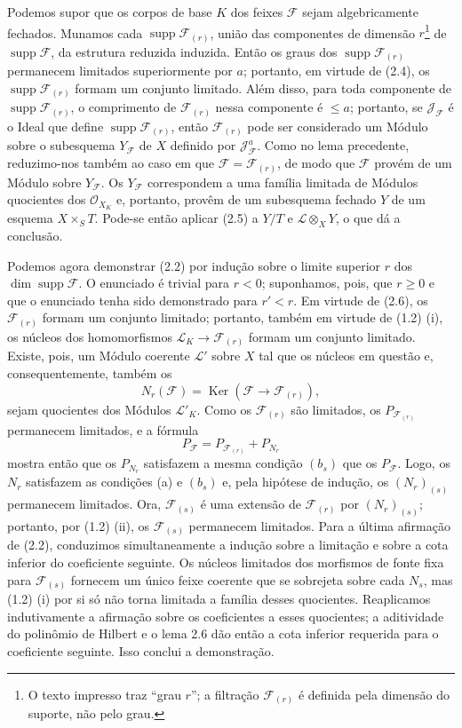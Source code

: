 Podemos supor que os corpos de base $K$ dos feixes $\mathcal F$ sejam
algebricamente fechados. Munamos cada
$\operatorname{supp}\mathcal F_{(r)}$, união das componentes de dimensão
$r$\footnote{O texto impresso traz “grau $r$”; a filtração
$\mathcal F_{(r)}$ é definida pela dimensão do suporte, não pelo grau.} de
$\operatorname{supp}\mathcal F$, da estrutura reduzida induzida. Então os graus dos
$\operatorname{supp}\mathcal F_{(r)}$ permanecem limitados superiormente por
$a$; portanto, em virtude de (2.4), os
$\operatorname{supp}\mathcal F_{(r)}$ formam um conjunto limitado. Além disso,
para toda componente de $\operatorname{supp}\mathcal F_{(r)}$, o comprimento de
$\mathcal F_{(r)}$ nessa componente é $\leq a$; portanto, se
$\mathcal J_{\mathcal F}$ é o Ideal que define
$\operatorname{supp}\mathcal F_{(r)}$, então $\mathcal F_{(r)}$
pode ser considerado um Módulo sobre o subesquema $Y_{\mathcal F}$ de $X$
definido por $\mathcal J_{\mathcal F}^{a}$. Como no lema precedente, reduzimo-nos também
ao caso em que $\mathcal F=\mathcal F_{(r)}$, de modo que $\mathcal F$
provém de um Módulo sobre $Y_{\mathcal F}$. Os $Y_{\mathcal F}$ correspondem
a uma família limitada de Módulos quocientes dos $\mathcal O_{X_K}$ e,
portanto, provêm de um subesquema fechado $Y$ de um esquema $X\times_S T$.
Pode-se então aplicar (2.5) a $Y/T$ e $\mathcal L\otimes_XY$, o que dá a
conclusão.

Podemos agora demonstrar (2.2) por indução sobre o limite superior $r$ dos
$\dim\operatorname{supp}\mathcal F$. O enunciado é trivial para $r<0$;
suponhamos, pois, que $r\geq0$ e que o enunciado tenha sido demonstrado para
$r'<r$. Em virtude de (2.6), os $\mathcal F_{(r)}$ formam um conjunto
limitado; portanto, também em virtude de (1.2) (i), os núcleos dos
homomorfismos $\mathcal L_K\longrightarrow\mathcal F_{(r)}$ formam um
conjunto limitado. Existe, pois, um Módulo coerente $\mathcal L'$ sobre $X$
tal que os núcleos em questão e, consequentemente, também os
\[
N_r(\mathcal F)=\operatorname{Ker}(\mathcal F\longrightarrow\mathcal F_{(r)}),
\]
sejam quocientes dos Módulos $\mathcal L'_K$. Como os $\mathcal F_{(r)}$ são
limitados, os $P_{\mathcal F_{(r)}}$ permanecem limitados, e a fórmula
\[
P_{\mathcal F}=P_{\mathcal F_{(r)}}+P_{N_r}
\]
mostra então que os $P_{N_r}$ satisfazem a mesma condição $(b_s)$ que os
$P_{\mathcal F}$. Logo, os $N_r$ satisfazem as condições (a) e $(b_s)$ e,
pela hipótese de indução, os $(N_r)_{(s)}$ permanecem limitados. Ora,
$\mathcal F_{(s)}$ é uma extensão de $\mathcal F_{(r)}$ por
$(N_r)_{(s)}$; portanto, por (1.2) (ii), os $\mathcal F_{(s)}$ permanecem
limitados. Para a última afirmação de (2.2), conduzimos simultaneamente a indução sobre a limitação e sobre a cota inferior do coeficiente seguinte. Os núcleos limitados dos morfismos de fonte fixa para $\mathcal F_{(s)}$ fornecem um único feixe coerente que se sobrejeta sobre cada $N_s$, mas (1.2) (i) por si só não torna limitada a família desses quocientes. Reaplicamos indutivamente a afirmação sobre os coeficientes a esses quocientes; a aditividade do polinômio de Hilbert e o lema 2.6 dão então a cota inferior requerida para o coeficiente seguinte. Isso conclui a demonstração.

